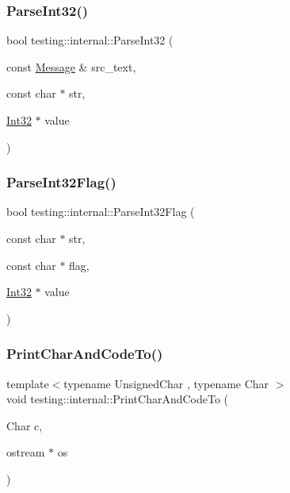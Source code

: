 \mbox{\label{namespacetesting_1_1internal_ac06fc81336a3d80755f4020d34321766}} 
\subsubsection{\texorpdfstring{ParseInt32()}{ParseInt32()}}
{\footnotesize\ttfamily bool testing\+::internal\+::\+Parse\+Int32 (\begin{DoxyParamCaption}\item[{const \mbox{\hyperlink{classtesting_1_1_message}{Message}} \&}]{src\+\_\+text,  }\item[{const char $\ast$}]{str,  }\item[{\mbox{\hyperlink{namespacetesting_1_1internal_af89e21e4043b5cf0c120af487b24fa06}{Int32}} $\ast$}]{value }\end{DoxyParamCaption})}

\mbox{\label{namespacetesting_1_1internal_ae3449e173767750b613114ceac6d916a}} 
\subsubsection{\texorpdfstring{ParseInt32Flag()}{ParseInt32Flag()}}
{\footnotesize\ttfamily bool testing\+::internal\+::\+Parse\+Int32\+Flag (\begin{DoxyParamCaption}\item[{const char $\ast$}]{str,  }\item[{const char $\ast$}]{flag,  }\item[{\mbox{\hyperlink{namespacetesting_1_1internal_af89e21e4043b5cf0c120af487b24fa06}{Int32}} $\ast$}]{value }\end{DoxyParamCaption})}

\mbox{\label{namespacetesting_1_1internal_a0c577e598e61d339ba45dd6643fb1969}} 
\subsubsection{\texorpdfstring{PrintCharAndCodeTo()}{PrintCharAndCodeTo()}}
{\footnotesize\ttfamily template$<$typename Unsigned\+Char , typename Char $>$ \\
void testing\+::internal\+::\+Print\+Char\+And\+Code\+To (\begin{DoxyParamCaption}\item[{Char}]{c,  }\item[{ostream $\ast$}]{os }\end{DoxyParamCaption})}

